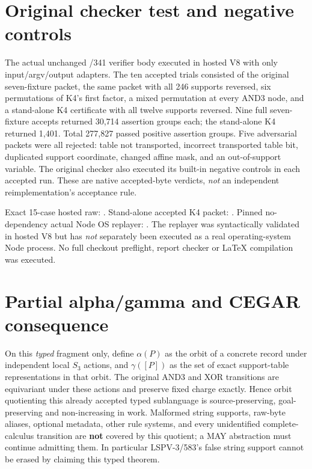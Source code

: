 \documentclass[11pt]{article}
\begin{document}
\section*{Original checker test and negative controls}
\noindent The actual unchanged /341 verifier body executed in hosted V8 with only input/argv/output adapters. The ten accepted trials consisted of the original seven-fixture packet, the same packet with all 246 supports reversed, six permutations of K4's first factor, a mixed permutation at every AND3 node, and a stand-alone K4 certificate with all twelve supports reversed. Nine full seven-fixture accepts returned 30,714 assertion groups each; the stand-alone K4 returned 1,401. Total 277,827 passed positive assertion groups. Five adversarial packets were all rejected: table not transported, incorrect transported table bit, duplicated support coordinate, changed affine mask, and an out-of-support variable. The original checker also executed its built-in negative controls in each accepted run. These are native accepted-byte verdicts, \emph{not} an independent reimplementation's acceptance rule.

\noindent Exact 15-case hosted raw: . Stand-alone accepted K4 packet: . Pinned no-dependency actual Node OS replayer: . The replayer was syntactically validated in hosted V8 but has \emph{not} separately been executed as a real operating-system Node process. No full checkout preflight, report checker or LaTeX compilation was executed.

\section*{Partial alpha/gamma and CEGAR consequence}
\noindent On this \emph{typed} fragment only, define $\alpha(P)$ as the orbit of a concrete record under independent local $S_3$ actions, and $\gamma([P])$ as the set of exact support-table representations in that orbit. The original AND3 and XOR transitions are equivariant under these actions and preserve fixed charge exactly. Hence orbit quotienting this already accepted typed sublanguage is source-preserving, goal-preserving and non-increasing in work. Malformed string supports, raw-byte aliases, optional metadata, other rule systems, and every unidentified complete-calculus transition are \textbf{not} covered by this quotient; a MAY abstraction must continue admitting them. In particular LSPV-3/583's false string support cannot be erased by claiming this typed theorem.
\end{document}
